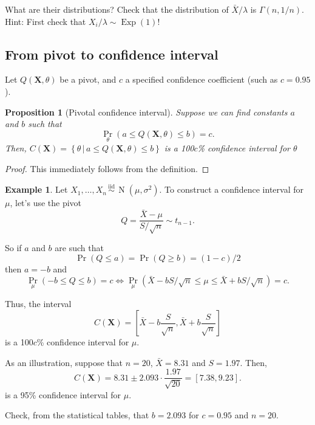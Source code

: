 \documentclass[
]{book}
\newcommand{\bX}{{\boldsymbol X}}
\DeclareMathOperator{\N}{N}
\DeclareMathOperator{\Exp}{Exp}
\newcommand{\iid}{\,\overset{\text{iid}}{\sim}\,}
\newtheorem{proposition}{Proposition}[chapter]
\theoremstyle{definition}
\theoremstyle{definition}
\newtheorem{example}{Example}[chapter]
\theoremstyle{definition}
\theoremstyle{definition}
\theoremstyle{remark}
\begin{document}
What are their distributions?
Check that the distribution of \(\bar X / \lambda\) is \(\Gamma(n,1/n)\). Hint: First check that \(X_i/\lambda \sim \Exp(1)\)!

\hypertarget{from-pivot-to-confidence-interval}{%
\subsection{From pivot to confidence interval}\label{from-pivot-to-confidence-interval}}

Let \(Q(\bX,\theta)\) be a pivot, and \(c\) a specified confidence coefficient (such as \(c=0.95\)).

\begin{proposition}[Pivotal confidence interval]
Suppose we can find constants \(a\) and \(b\) such that
\[
\Pr_\theta\left( a \leq Q(\bX,\theta) \leq b \right) = c.
\]
Then, \(C(\bX)=\left\{\theta \, \big| \, a \leq Q(\bX,\theta) \leq b \right\}\) is a 100\(c\)\% confidence interval for \(\theta\)
\end{proposition}

\begin{proof}
This immediately follows from the definition.
\end{proof}

\begin{example}
Let \(X_1,\dots,X_n\iid \N(\mu,\sigma^2)\). To construct a confidence interval for \(\mu\), let's use the pivot
\[
Q = \frac{\bar X - \mu}{S/\sqrt n} \sim t_{n-1}.
\]

So if \(a\) and \(b\) are such that
\[
\Pr(Q \leq a) = \Pr(Q \geq b) = (1-c)/2
\]
then \(a=-b\) and
\[
\Pr_\mu\left(-b \leq Q \leq b \right) = c \Leftrightarrow \Pr_\mu \left(\bar X - bS/\sqrt n \leq \mu \leq \bar X + bS/\sqrt n \right) = c.
\]

Thus, the interval
\[
C(\bX) = \left[\bar X - b \frac{S}{\sqrt n}, \bar X + b \frac{S}{\sqrt n} \right]
\]
is a 100\(c\)\% confidence interval for \(\mu\).

As an illustration, suppose that \(n=20\), \(\bar X=8.31\) and \(S = 1.97\). Then,
\[
C(\bX) = 8.31 \pm 2.093 \cdot \frac{1.97}{\sqrt{20}}= [7.38, 9.23].
\]
is a 95\% confidence interval for \(\mu\).
\end{example}

Check, from the statistical tables, that \(b=2.093\) for \(c=0.95\) and \(n=20\).
\end{document}
